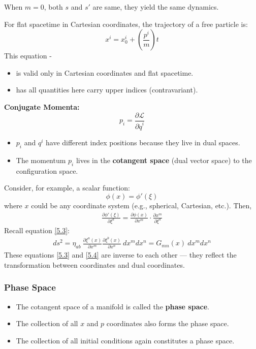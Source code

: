 \documentclass[14pt]{article} %
\begin{document}
When $m = 0$, both $s$ and $s'$ are same, they yield the same dynamics.
\begin{tcolorbox}[proofbox, title=\textbf{Note:}]
For flat spacetime in Cartesian coordinates, the trajectory of a free particle is:
\[
x^i = x^i_0 + \left( \frac{p^i}{m} \right)t
\]
This equation -
\begin{itemize}
    \item is valid only in Cartesian coordinates and flat spacetime.
    \item has all quantities here carry upper indices (contravariant).
\end{itemize}

\vspace{1em}
\noindent
\textbf{Conjugate Momenta:}
\[
p_i = \frac{\partial \mathcal{L}}{\partial \dot{q}^i}
\]

\begin{itemize}
    \item $p_i$ and $q^i$ have different index positions because they live in dual spaces.
    \item The momentum $p_i$ lives in the \textbf{cotangent space} (dual vector space) to the configuration space.
\end{itemize}
\end{tcolorbox}
Consider, for example, a scalar function: 
$$\phi(x) = \phi'(\xi)$$
where $x$ could be any coordinate system (e.g., spherical, Cartesian, etc.). Then,
\begin{align*}
    \frac{\partial \phi'(\xi)}{\partial \xi^a} 
    = \frac{\partial \phi(x)}{\partial x^m} \cdot \frac{\partial x^m}{\partial \xi^a} \tag{5.4} \label{5.4}
\end{align*}
Recall equation \eqref{5.3}:
\begin{align*}
    ds^2 = \eta_{ab}~ \frac{\partial \xi^a(x)}{\partial x^m} \frac{\partial \xi^b(x)}{\partial x^n}~ dx^m dx^n = G_{mn}(x)~ dx^m dx^n
\end{align*}
These equations \eqref{5.3} and \eqref{5.4} are inverse to each other — they reflect the transformation between coordinates and dual coordinates.
\begin{tcolorbox}[proofbox, title=\textbf{Note:}]
\subsubsection*{Phase Space}
\begin{itemize}
    \item The cotangent space of a manifold is called the \textbf{phase space}.
    \item The collection of all $x$ and $p$ coordinates also forms the phase space.
    \item The collection of all initial conditions again constitutes a phase space.
\end{itemize}
\end{tcolorbox}
\end{document}
